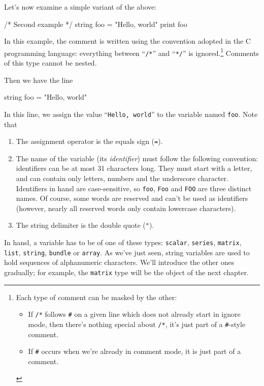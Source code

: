 Let's now examine a simple variant of the above:
\begin{code}
  /*
    Second example
  */
  string foo = "Hello, world"
  print foo
\end{code}

In this example, the comment is written using the convention adopted
in the C programming language: everything between ``\verb|/*|'' and
``\verb|*/|'' is ignored.\footnote{Each type of comment can be masked
  by the other:
\begin{itemize}
\item If \texttt{/*} follows \texttt{\#} on a given line which does
  not already start in ignore mode, then there's nothing special about
  \texttt{/*}, it's just part of a \texttt{\#}-style comment.
\item If \texttt{\#} occurs when we're already in comment mode, it is
  just part of a comment.
\end{itemize}} Comments of this type cannot be nested.

Then we have the line
\begin{code}
  string foo = "Hello, world"
\end{code}
In this line, we assign the value ``\texttt{Hello, world}'' to the
variable named \texttt{foo}. Note that
\begin{enumerate}
\item The assignment operator is the equals sign (\texttt{=}).
\item The name of the variable (its \emph{identifier}) must follow
  the following convention: identifiers can be at most 31 characters
  long. They must start with a letter, and can contain only letters,
  numbers and the underscore character. Identifiers in hansl are
  case-sensitive, so \texttt{foo}, \texttt{Foo} and \texttt{FOO} are
  three distinct names. Of course, some words are reserved and can't
  be used as identifiers (however, nearly all reserved words only
  contain lowercase characters).
\item The string delimiter is the double quote (\verb|"|). 
\end{enumerate}

In hansl, a variable has to be of one of these types: \texttt{scalar},
\texttt{series}, \texttt{matrix}, \texttt{list}, \texttt{string},
\texttt{bundle} or \texttt{array}. As we've just seen, string
variables are used to hold sequences of alphanumeric characters. We'll
introduce the other ones gradually; for example, the \texttt{matrix}
type will be the object of the next chapter.

